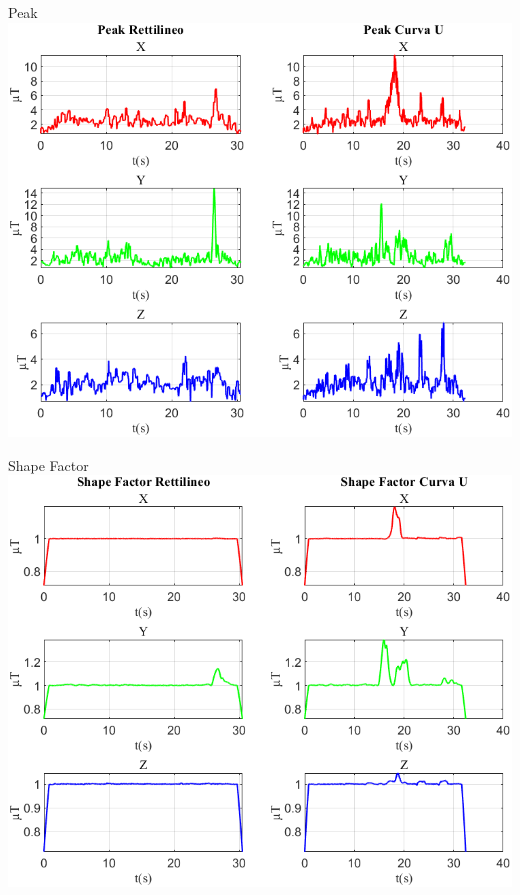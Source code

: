 \documentclass[beamer]{standalone}
\begin{document}
	
	\begin{frame}{{Peak}}
		\centering\includegraphics[height=.8\textheight]{figure/Mag/Peak}
	\end{frame}
	
%	
	
	\begin{frame}{{Shape Factor}}
		\centering\includegraphics[height=.8\textheight]{figure/Mag/Shape Factor}
	\end{frame}
	
\end{document}
